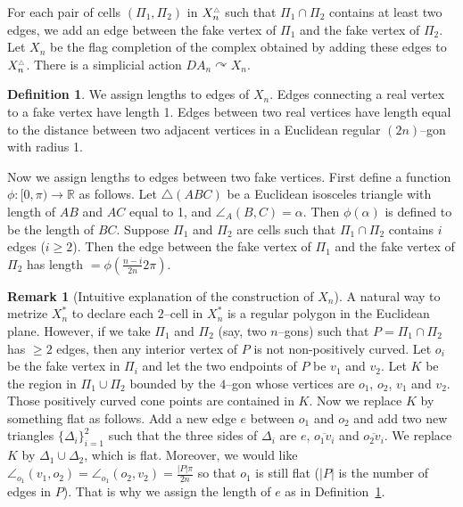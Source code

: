 \documentclass[11pt]{amsart}
\theoremstyle{definition}
\newtheorem{definition}[theorem]{Definition}
\newtheorem{remark}[theorem]{Remark}
\newcommand{\act}{\curvearrowright}
\newcommand{\Xa}{X^{\ast}}
\newcommand{\Xb}{X^{\scalebox{0.53}{$\triangle$}}}
\begin{document}
For each pair of cells $(\Pi_1,\Pi_2)$ in $\Xb_n$ such that $\Pi_1\cap\Pi_2$ contains at least two edges, we add an edge between the fake vertex of $\Pi_1$ and the fake vertex of $\Pi_2$. Let $X_n$ be the flag completion of the complex obtained by adding these edges to $\Xb_n$. There is a simplicial action $DA_n\act X_n$.

\begin{definition}
	\label{def:length}
	We assign lengths to edges of $X_n$. Edges connecting a real vertex to a fake vertex have length 1. Edges between two real vertices have length equal to the distance between two adjacent vertices in a Euclidean regular $(2n)$--gon with radius 1. 
	
	Now we assign lengths to edges between two fake vertices. First define a function $\phi\colon[0,\pi)\to \mathbb R$ as follows. Let $\triangle(ABC)$ be a Euclidean isosceles triangle with length of $AB$ and $AC$ equal to 1, and $\angle_A(B,C)=\alpha$. Then $\phi(\alpha)$ is defined to be the length of $BC$. Suppose $\Pi_1$ and $\Pi_2$ are cells such that $\Pi_1\cap\Pi_2$ contains $i$ edges ($i\ge 2$). Then the edge between the fake vertex of $\Pi_1$ and the fake vertex of $\Pi_2$ has length $=\phi(\frac{n-i}{2n}2\pi)$.
\end{definition}

\begin{remark}[Intuitive explanation of the construction of $X_n$]
A natural way to metrize $\Xa_n$ to declare each $2$--cell in $\Xa_n$ is a regular polygon in the Euclidean plane. However, if we take $\Pi_1$ and $\Pi_2$ (say, two $n$--gons) such that $P=\Pi_1\cap\Pi_2$ has $\ge 2$ edges, then any interior vertex of $P$ is not non-positively curved. Let $o_i$ be the fake vertex in $\Pi_i$ and let the two endpoints of $P$ be $v_1$ and $v_2$. Let $K$ be the region in $\Pi_1\cup \Pi_2$ bounded by the $4$--gon whose vertices are $o_1$, $o_2$, $v_1$ and $v_2$. Those positively curved cone points are contained in $K$. Now we replace $K$ by something flat as follows. Add a new edge $e$ between $o_1$ and $o_2$ and add two new triangles $\{\Delta_i\}_{i=1}^2$ such that the three sides of $\Delta_i$ are $e$, $\overline{o_1v_i}$ and $\overline{o_2v_i}$. We replace $K$ by $\Delta_1\cup\Delta_2$, which is flat. Moreover, we would like $\angle_{o_1}(v_1,o_2)=\angle_{o_1}(o_2,v_2)=\frac{|P|\pi}{2n}$ so that $o_1$ is still flat ($|P|$ is the number of edges in $P$). That is why we assign the length of $e$ as in Definition~\ref{def:length}.
\end{remark}
\end{document}
